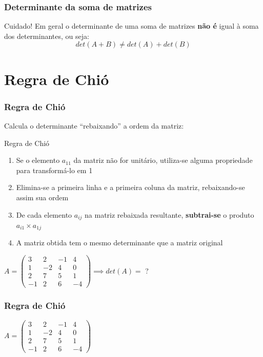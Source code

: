 \documentclass[pdftex, brazil]{beamer}
\begin{document}
\begin{frame}[t]
  \frametitle{Determinante da soma de matrizes}
  \begin{alertblock}{Cuidado!}
    Em geral o determinante de uma soma de matrizes \textbf{não é} igual à soma
    dos determinantes, ou seja: $$det(A + B) \ne det(A) + det(B)$$
  \end{alertblock}
\end{frame}


\section{Regra de Chió}

\begin{frame}[t]
  \frametitle{Regra de Chió}
  Calcula o determinante ``rebaixando'' a ordem da matriz:
  \begin{block}{Regra de Chió}
    \begin{enumerate}
      \item Se o elemento $a_{11}$ da matriz não for unitário, utiliza-se alguma
        propriedade para transformá-lo em 1
      \item Elimina-se a primeira linha e a primeira coluna da matriz,
        rebaixando-se assim sua ordem
      \item De cada elemento $a_{ij}$ na matriz rebaixada resultante,
        \textbf{subtrai-se} o produto $a_{i1} \times a_{1j}$
      \item A matriz obtida tem o mesmo determinante que a matriz original
    \end{enumerate}
  \end{block}
  $A = \begin{pmatrix}
    3 & 2 & -1 & 4\\
    1 & -2 & 4 & 0\\
    2 & 7 & 5 & 1\\
    -1 & 2 & 6 & -4\end{pmatrix} \implies det(A) = $ ?
\end{frame}

\begin{frame}[t]
  \frametitle{Regra de Chió}
  $A = \begin{pmatrix}
    3 & 2 & -1 & 4\\
    1 & -2 & 4 & 0\\
    2 & 7 & 5 & 1\\
    -1 & 2 & 6 & -4\end{pmatrix}$
\end{frame}
\end{document}
